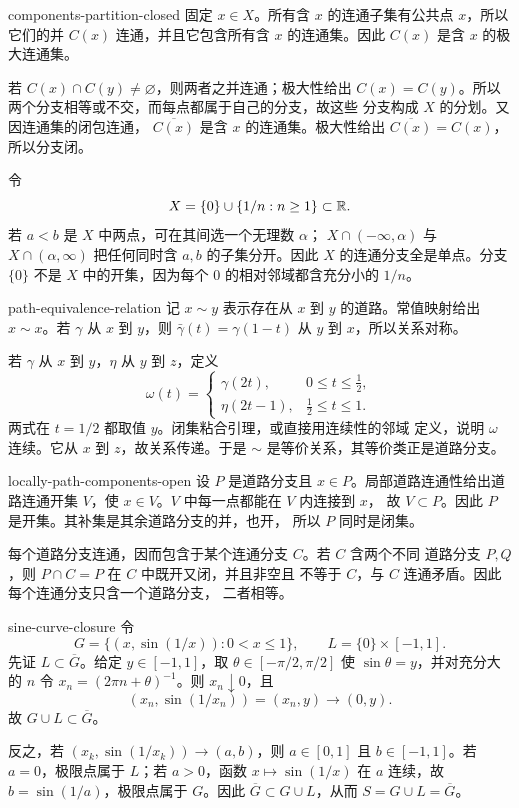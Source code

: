 \begin{solution}{components-partition-closed}
固定 \(x\in X\)。所有含 \(x\) 的连通子集有公共点 \(x\)，所以它们的并
\(C(x)\) 连通，并且它包含所有含 \(x\) 的连通集。因此 \(C(x)\) 是含
\(x\) 的极大连通集。

若 \(C(x)\cap C(y)\ne\varnothing\)，则两者之并连通；极大性给出
\(C(x)=C(y)\)。所以两个分支相等或不交，而每点都属于自己的分支，故这些
分支构成 \(X\) 的分划。又因连通集的闭包连通，
\(\overline{C(x)}\) 是含 \(x\) 的连通集。极大性给出
\(\overline{C(x)}=C(x)\)，所以分支闭。

令
\[
 X=\{0\}\cup\{1/n:n\ge1\}\subset\mathbb{R} .
\]
若 \(a<b\) 是 \(X\) 中两点，可在其间选一个无理数 \(\alpha\)；
\(X\cap(-\infty,\alpha)\) 与 \(X\cap(\alpha,\infty)\) 把任何同时含
\(a,b\) 的子集分开。因此 \(X\) 的连通分支全是单点。分支
\(\{0\}\) 不是 \(X\) 中的开集，因为每个 \(0\) 的相对邻域都含充分小的
\(1/n\)。
\end{solution}

\begin{solution}{path-equivalence-relation}
记 \(x\sim y\) 表示存在从 \(x\) 到 \(y\) 的道路。常值映射给出
\(x\sim x\)。若 \(\gamma\) 从 \(x\) 到 \(y\)，则
\(\bar\gamma(t)=\gamma(1-t)\) 从 \(y\) 到 \(x\)，所以关系对称。

若 \(\gamma\) 从 \(x\) 到 \(y\)，\(\eta\) 从 \(y\) 到 \(z\)，定义
\[
 \omega(t)=
 \begin{cases}
  \gamma(2t),&0\le t\le\tfrac12,\\
  \eta(2t-1),&\tfrac12\le t\le1.
 \end{cases}
\]
两式在 \(t=1/2\) 都取值 \(y\)。闭集粘合引理，或直接用连续性的邻域
定义，说明 \(\omega\) 连续。它从 \(x\) 到 \(z\)，故关系传递。于是
\(\sim\) 是等价关系，其等价类正是道路分支。
\end{solution}

\begin{solution}{locally-path-components-open}
设 \(P\) 是道路分支且 \(x\in P\)。局部道路连通性给出道路连通开集
\(V\)，使 \(x\in V\)。\(V\) 中每一点都能在 \(V\) 内连接到 \(x\)，
故 \(V\subset P\)。因此 \(P\) 是开集。其补集是其余道路分支的并，也开，
所以 \(P\) 同时是闭集。

每个道路分支连通，因而包含于某个连通分支 \(C\)。若 \(C\) 含两个不同
道路分支 \(P,Q\)，则 \(P\cap C=P\) 在 \(C\) 中既开又闭，并且非空且
不等于 \(C\)，与 \(C\) 连通矛盾。因此每个连通分支只含一个道路分支，
二者相等。
\end{solution}

\begin{solution}{sine-curve-closure}
令
\[
 G=\{(x,\sin(1/x)):0<x\le1\},\qquad
 L=\{0\}\times[-1,1].
\]
先证 \(L\subset\overline G\)。给定 \(y\in[-1,1]\)，取
\(\theta\in[-\pi/2,\pi/2]\) 使 \(\sin\theta=y\)，并对充分大的 \(n\)
令 \(x_n=(2\pi n+\theta)^{-1}\)。则 \(x_n\downarrow0\)，且
\[
 (x_n,\sin(1/x_n))=(x_n,y)\longrightarrow(0,y).
\]
故 \(G\cup L\subset\overline G\)。

反之，若 \((x_k,\sin(1/x_k))\to(a,b)\)，则 \(a\in[0,1]\) 且
\(b\in[-1,1]\)。若 \(a=0\)，极限点属于 \(L\)；若 \(a>0\)，函数
\(x\mapsto\sin(1/x)\) 在 \(a\) 连续，故 \(b=\sin(1/a)\)，极限点属于
\(G\)。因此 \(\overline G\subset G\cup L\)，从而
\(S=G\cup L=\overline G\)。
\end{solution}

